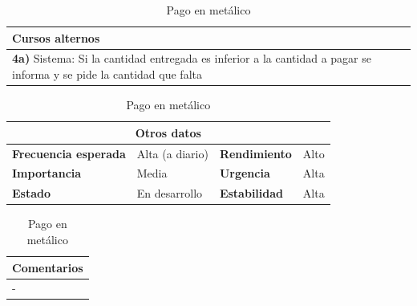 \documentclass[12pt,spanish]{article}
\begin{document}
\begin{table}[H]
\vspace{1cm}

\begin{tabular}{|m{10pt}|m{7.15cm}|m{10pt}|m{7.15cm}|}
\hline
\multicolumn{4}{|m{16.2cm}|}{\textbf{Cursos alternos}} \\
\hline
\multicolumn{4}{|m{16.2cm}|}{\textbf{4a)} Sistema: Si la cantidad entregada es inferior a la cantidad a pagar se informa y se pide la cantidad que falta} \\
\hline
\end{tabular}

\vspace{1cm}

\begin{tabular}{|m{3.72cm}|m{3.72cm}|m{3.72cm}|m{3.72cm}|}
\hline
\multicolumn{4}{|c|}{\textbf{Otros datos}} \\
\hline
\textbf{Frecuencia esperada} & Alta (a diario) & \textbf{Rendimiento} & Alto \\
\hline
\textbf{Importancia} & Media & \textbf{Urgencia} & Alta \\
\hline
\textbf{Estado} & En desarrollo & \textbf{Estabilidad} & Alta \\
\hline
\end{tabular}

\vspace{1cm}

\begin{tabular}{|m{16.2cm}|}
\hline
\textbf{Comentarios} \\
\hline
- \\
\hline
\end{tabular}

\caption{Pago en metálico}

\end{table}

\end{document}
